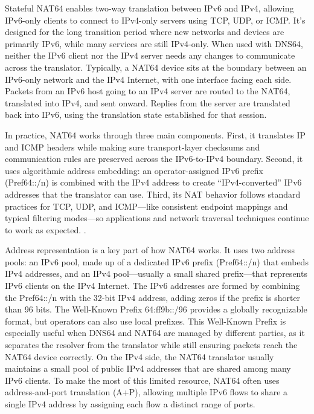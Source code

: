Stateful NAT64 enables two-way translation between IPv6 and IPv4, allowing IPv6-only clients to connect to IPv4-only servers using TCP, UDP, or ICMP. It's designed for the long transition period where new networks and devices are primarily IPv6, while many services are still IPv4-only. When used with DNS64, neither the IPv6 client nor the IPv4 server needs any changes to communicate across the translator. Typically, a NAT64 device sits at the boundary between an IPv6-only network and the IPv4 Internet, with one interface facing each side. Packets from an IPv6 host going to an IPv4 server are routed to the NAT64, translated into IPv4, and sent onward. Replies from the server are translated back into IPv6, using the translation state established for that session\cite{rfc6146}.

In practice, NAT64 works through three main components. First, it translates IP and ICMP headers while making sure transport-layer checksums and communication rules are preserved across the IPv6-to-IPv4 boundary. Second, it uses algorithmic address embedding: an operator-assigned IPv6 prefix (Pref64::/n) is combined with the IPv4 address to create “IPv4-converted” IPv6 addresses that the translator can use. Third, its NAT behavior follows standard practices for TCP, UDP, and ICMP—like consistent endpoint mappings and typical filtering modes—so applications and network traversal techniques continue to work as expected. \cite{rfc6146,6231295}.

Address representation is a key part of how NAT64 works. It uses two address pools: an IPv6 pool, made up of a dedicated IPv6 prefix (Pref64::/n) that embeds IPv4 addresses, and an IPv4 pool—usually a small shared prefix—that represents IPv6 clients on the IPv4 Internet. The IPv6 addresses are formed by combining the Pref64::/n with the 32-bit IPv4 address, adding zeros if the prefix is shorter than 96 bits. The Well-Known Prefix 64:ff9b::/96 provides a globally recognizable format, but operators can also use local prefixes. This Well-Known Prefix is especially useful when DNS64 and NAT64 are managed by different parties, as it separates the resolver from the translator while still ensuring packets reach the NAT64 device correctly. On the IPv4 side, the NAT64 translator usually maintains a small pool of public IPv4 addresses that are shared among many IPv6 clients. To make the most of this limited resource, NAT64 often uses address-and-port translation (A+P), allowing multiple IPv6 flows to share a single IPv4 address by assigning each flow a distinct range of ports\cite{6231295,rfc6146}.

